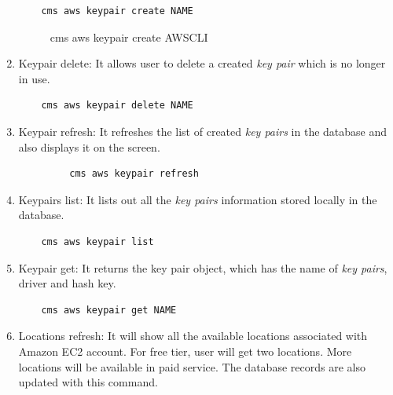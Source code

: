 \documentclass[9pt,twocolumn,twoside]{../../styles/osajnl}
\begin{document}
\begin{enumerate}
    \begin{verbatim}
    cms aws keypair create NAME
    \end{verbatim}
    
    \begin{figure}[h!]
    	\centering
    	\caption{cms aws keypair create AWSCLI}
    	\label{fig:keypaircreate}
    \end{figure}

    \item Keypair delete: It allows user to delete a created \textit{key pair} which is no longer in use.
    
    \begin{verbatim}
    cms aws keypair delete NAME
    \end{verbatim}
    
    \item Keypair refresh: It refreshes the list of created \textit{key pairs} in the database and also displays it on the screen.
    
    \begin{verbatim}
	     cms aws keypair refresh
    \end{verbatim}
    
    \item Keypairs list: It lists out all the \textit{key pairs} information stored locally in the database.
           
    \begin{verbatim}
    cms aws keypair list
    \end{verbatim}
    
    \item Keypair get: It returns the key pair object, which has the name of \textit{key pairs}, driver and hash key.
    
    \begin{verbatim}
    cms aws keypair get NAME
    \end{verbatim}
    
    
    \item Locations refresh: It will show all the available locations associated with Amazon EC2 account. For free tier, user will get two locations. More locations will be available in paid service. The database records are also updated with this command.
    

\end{enumerate}
\end{document}
